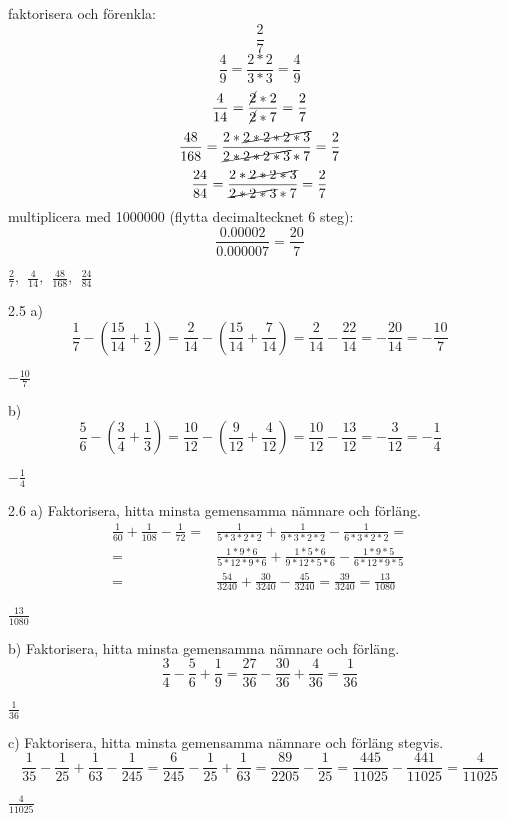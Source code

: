 \pagebreak
\begin{task}{2.4}
	faktorisera och förenkla:
	\[\dfrac{2}{7}\]
	\[\dfrac{4}{9}=\dfrac{2*2}{3*3}=\dfrac{4}{9}\]
	\[\dfrac{4}{14}=\dfrac{\cancel{2}*2}{\cancel{2}*7}=\dfrac{2}{7}\]
	\[\dfrac{48}{168}=\dfrac{2*\cancel{2*2*2*3}}{\cancel{2*2*2*3}*7}=\dfrac{2}{7}\]
	\[\dfrac{24}{84}=\dfrac{2*\cancel{2*2*3}}{\cancel{2*2*3}*7}=\dfrac{2}{7}\]
	multiplicera med 1000000 (flytta decimaltecknet 6 steg):
	\[\dfrac{0.00002}{0.000007}=\dfrac{20}{7}\]
	
	\ans $\frac{2}{7},~~ \frac{4}{14},~~ \frac{48}{168},~~ \frac{24}{84}$
\end{task}

\begin{task}{2.5 a)}
	\[\frac{1}{7}-\left(\frac{15}{14}+\frac{1}{2}\right)=\frac{2}{14}-\left(\frac{15}{14}+\frac{7}{14}\right)=\frac{2}{14}-\frac{22}{14}=-\frac{20}{14}=-\frac{10}{7}\]
	
	\ans $-\frac{10}{7}$
\end{task}

\begin{task}{b)}
	\[\frac{5}{6}-\left(\frac{3}{4}+\frac{1}{3}\right)=\frac{10}{12}-\left(\frac{9}{12}+\frac{4}{12}\right)=\frac{10}{12}-\frac{13}{12}=-\frac{3}{12}=-\frac{1}{4}\]
	
	\ans $-\frac{1}{4}$
\end{task}

\begin{task}{2.6 a)}
	Faktorisera, hitta minsta gemensamma nämnare och förläng.
	\begin{align*}
	\frac{1}{60}+\frac{1}{108}-\frac{1}{72}=&
	\frac{1}{5*3*2*2}+\frac{1}{9*3*2*2}-\frac{1}{6*3*2*2}= \\
	=&\frac{1*9*6}{5*12*9*6}+\frac{1*5*6}{9*12*5*6}-\frac{1*9*5}{6*12*9*5} \\
	=&\frac{54}{3240}+\frac{30}{3240}-\frac{45}{3240}=\frac{39}{3240}=\frac{13}{1080}
	\end{align*}
	
	\ans $\frac{13}{1080}$
\end{task}

\begin{task}{b)}
	Faktorisera, hitta minsta gemensamma nämnare och förläng.
	\[\frac{3}{4}-\frac{5}{6}+\frac{1}{9}=\frac{27}{36}-\frac{30}{36}+\frac{4}{36}=\frac{1}{36}\]
	
	\ans $\frac{1}{36}$
\end{task}

\begin{task}{c)}
	Faktorisera, hitta minsta gemensamma nämnare och förläng stegvis.
	\[\frac{1}{35}-\frac{1}{25}+\frac{1}{63}-\frac{1}{245}=
	\frac{6}{245}-\frac{1}{25}+\frac{1}{63}=
	\frac{89}{2205}-\frac{1}{25}=
	\frac{445}{11025}-\frac{441}{11025}=
	\frac{4}{11025}\]
	
	\ans $\frac{4}{11025}$
\end{task}

